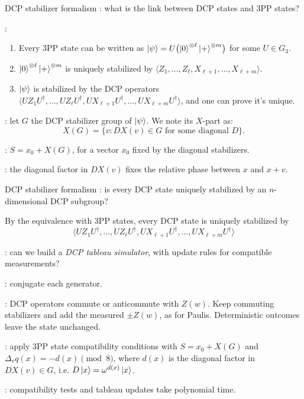 \documentclass[aspectratio=169,11pt,t]{beamer}
\begin{document}
\begin{frame}{DCP stabilizer formalism}
  : what is the link between DCP states and 3PP states? \pause {}

  \pause
  :
  \begin{enumerate}
    \item Every 3PP state can be written as $\ket{\psi}=U\bigl(\ket{0}^{\otimes \ell}\ket{+}^{\otimes m}\bigr)$ for some $U\in G_3$.
    \item $\ket{0}^{\otimes \ell}\ket{+}^{\otimes m}$ is uniquely stabilized by $\langle Z_1,\ldots,Z_\ell,X_{\ell+1},\ldots,X_{\ell+m} \rangle$.
    \item $\ket{\psi}$ is stabilized by the DCP operators $\langle U Z_1 U^\dag,\ldots,U Z_\ell U^\dag,U X_{\ell+1} U^\dag,\ldots,U X_{\ell+m} U^\dag \rangle$, and one can prove it's unique.
  \end{enumerate}


  \pause
  : let $G$ the DCP stabilizer group of $\ket{\psi}$. We note its $X$-part as:
  \[
    X(G)=\{v:DX(v)\in G\text{ for some diagonal }D\}.
  \]

  : $S=x_0+X(G)$, for a vector $x_0$ fixed by the diagonal stabilizers.

  \pause
  : the diagonal factor in $DX(v)$ fixes the relative phase
  between $x$ and $x+v$.
\end{frame}

\begin{frame}{DCP stabilizer formalism}
  : is every DCP state uniquely stabilized by an $n$-dimensional DCP subgroup? \pause {}

  \pause
  By the equivalence with 3PP states,
  every DCP state is uniquely stabilized by
  \[
    \langle U Z_1 U^\dag,\ldots,U Z_\ell U^\dag,U X_{\ell+1} U^\dag,\ldots,U X_{\ell+m} U^\dag \rangle
  \]

  \pause
  : can we build a \textit{DCP tableau simulator}, with update rules for compatible measurements?

  \pause
  : conjugate each generator.

  \pause
  : DCP operators commute or anticommute with $Z(w)$.
  Keep commuting stabilizers and add the measured $\pm Z(w)$, as for Paulis.
  Deterministic outcomes leave the state unchanged.

  \pause
  : apply 3PP state compatibility conditions with $S=x_0+X(G)$ and $\Delta_v q(x)=-d(x)\pmod 8$, where $d(x)$ is the diagonal factor in $DX(v)\in G$, i.e. $D\ket{x}=\omega^{d(x)}\ket{x}$.

  \pause
  : compatibility tests and tableau updates take polynomial time.
\end{frame}
\end{document}
